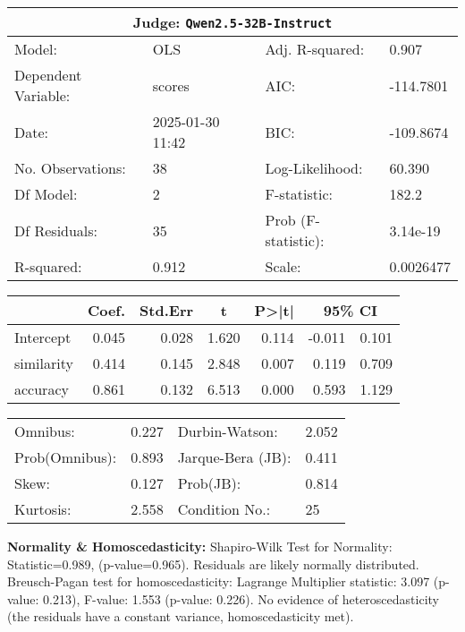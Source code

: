 \begin{center}
\small
\begin{tabular}{llll}
\toprule
\multicolumn{4}{c}{\textbf{Judge:} \texttt{Qwen2.5-32B-Instruct} \citep{qwen2025qwen25technicalreport}} \\
\midrule
Model: & OLS & Adj. R-squared: & 0.907 \\
Dependent Variable: & scores & AIC: & -114.7801 \\
Date: & 2025-01-30 11:42 & BIC: & -109.8674 \\
No. Observations: & 38 & Log-Likelihood: & 60.390 \\
Df Model: & 2 & F-statistic: & 182.2 \\
Df Residuals: & 35 & Prob (F-statistic): & 3.14e-19 \\
R-squared: & 0.912 & Scale: & 0.0026477 \\
\bottomrule
\end{tabular}

\vspace{5pt}
\begin{tabular}{lrrrrrr}
\toprule
 & \multicolumn{1}{c}{Coef.} & \multicolumn{1}{c}{Std.Err} & \multicolumn{1}{c}{t} & \multicolumn{1}{c}{P>|t|} & \multicolumn{2}{c}{95\% CI} \\
\midrule
Intercept & 0.045 & 0.028 & 1.620 & 0.114 & -0.011 & 0.101 \\
similarity & 0.414 & 0.145 & 2.848 & 0.007 & 0.119 & 0.709 \\
accuracy & 0.861 & 0.132 & 6.513 & 0.000 & 0.593 & 1.129 \\
\bottomrule
\end{tabular}

\vspace{5pt}
\begin{tabular}{llll}
\toprule
\midrule
Omnibus: & 0.227 & Durbin-Watson: & 2.052 \\
Prob(Omnibus): & 0.893 & Jarque-Bera (JB): & 0.411 \\
Skew: & 0.127 & Prob(JB): & 0.814 \\
Kurtosis: & 2.558 & Condition No.: & 25 \\
\bottomrule
\end{tabular}
\end{center}

\textbf{Normality \& Homoscedasticity:} Shapiro-Wilk Test for Normality: Statistic=0.989, (p-value=0.965). 
Residuals are likely normally distributed. 
Breusch-Pagan test for homoscedasticity:
Lagrange Multiplier statistic: 3.097 
(p-value: 0.213), 
F-value: 1.553 
(p-value: 0.226). 
No evidence of heteroscedasticity (the residuals have a constant variance, homoscedasticity met).

